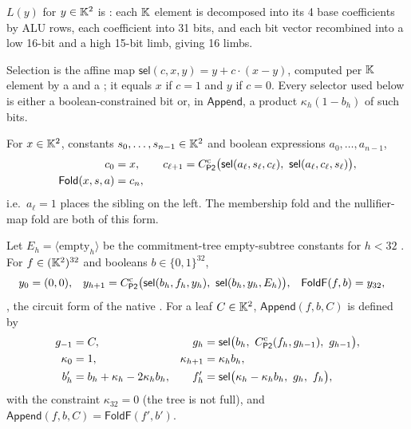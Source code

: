 \begin{definition}
$L(y)$ for $y\in\mathbb{K}^2$ is : each $\mathbb{K}$ element is
decomposed into its 4 base coefficients by ALU rows, each coefficient into 31
bits, and each bit vector recombined into a low 16-bit and a high 15-bit limb,
giving 16 limbs. 
\end{definition}

Selection is the affine map $\mathsf{sel}(c,x,y)=y+c\cdot(x-y)$, computed per
$\mathbb{K}$ element by a  and a 
;
it equals $x$ if $c=1$ and $y$ if $c=0$. Every selector used below is either a
boolean-constrained bit  or, in
$\mathsf{Append}$, a product $\kappa_h(1-b_h)$ of such bits.

\begin{definition}
For $x\in\mathbb{K}^2$, constants $s_0,\dots,s_{n-1}\in\mathbb{K}^2$ and boolean expressions
$a_0,\dots,a_{n-1}$,
\begin{align}
  c_0 &= x, \qquad
  c_{\ell+1} = \Cp^{\mathrm{c}}\big(\mathsf{sel}(a_\ell,s_\ell,c_\ell),\ \mathsf{sel}(a_\ell,c_\ell,s_\ell)\big),\\
  \mathsf{Fold}(x,s,a) &= c_n ,
\end{align}
i.e.\ $a_\ell=1$ places the sibling on the left. The membership fold
 and the nullifier-map fold
 are both of this form.
\end{definition}

\begin{definition}
Let $E_h=\langle\mathrm{empty}_h\rangle$ be the commitment-tree empty-subtree
constants for $h<32$ .
For $f\in(\mathbb{K}^2)^{32}$ and booleans $b\in\{0,1\}^{32}$,
\begin{align}
  y_0 &= (0,0), &
  y_{h+1} &= \Cp^{\mathrm{c}}\big(\mathsf{sel}(b_h,f_h,y_h),\ \mathsf{sel}(b_h,y_h,E_h)\big), &
  \mathsf{FoldF}(f,b) &= y_{32},
\end{align}
, the circuit form of the
native  .
For a leaf $C\in\mathbb{K}^2$, $\mathsf{Append}(f,b,C)$ is defined by
\begin{align}
  g_{-1} &= C, & g_h &= \mathsf{sel}\big(b_h,\ \Cp^{\mathrm{c}}(f_h,g_{h-1}),\ g_{h-1}\big),\\
  \kappa_0 &= 1, & \kappa_{h+1} &= \kappa_h b_h,\\
  b'_h &= b_h+\kappa_h-2\kappa_h b_h, & f'_h &= \mathsf{sel}\big(\kappa_h-\kappa_h b_h,\ g_h,\ f_h\big),
\end{align}
with the constraint $\kappa_{32}=0$ (the tree is not full), and
$\mathsf{Append}(f,b,C)=\mathsf{FoldF}(f',b')$.
\end{definition}

